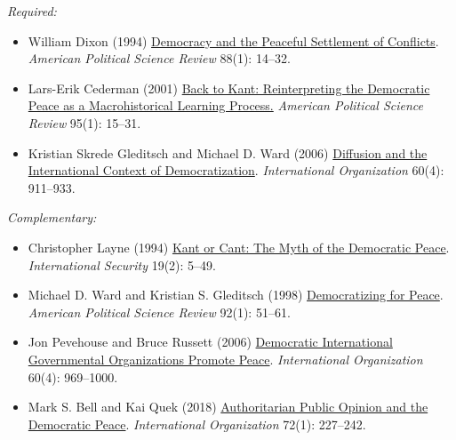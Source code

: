 \documentclass[12pt, a4paper]{article}
\begin{document}
\noindent\textit{Required:}

\begin{itemize}
	\item William Dixon (1994) \href{https://doi.org/10.2307/2944879}{Democracy and the Peaceful Settlement of Conflicts}. \textit{American Political Science Review} 88(1): 14--32.
  \item Lars-Erik Cederman (2001) \href{https://doi.org/10.1017/S0003055401000028}{Back to Kant: Reinterpreting the Democratic Peace as a Macrohistorical Learning Process.} \textit{American Political Science Review} 95(1): 15--31.
	\item Kristian Skrede Gleditsch and Michael D. Ward (2006) \href{https://doi.org/10.1017/S0020818306060309}{Diffusion and the International Context of Democratization}. \textit{International Organization} 60(4): 911--933.
	\end{itemize}

\noindent\textit{Complementary:}

\begin{itemize}
	\item Christopher Layne (1994) \href{https://doi.org/10.2307/2539195}{Kant or Cant: The Myth of the Democratic Peace}. \textit{International Security} 19(2): 5--49.
  \item Michael D. Ward and Kristian S. Gleditsch (1998) \href{https://doi.org/10.2307/2585928}{Democratizing for Peace}. \textit{American Political Science Review} 92(1): 51--61.
	\item Jon Pevehouse and Bruce Russett (2006) \href{https://doi.org/10.1017/S0020818306060322}{Democratic International Governmental Organizations Promote Peace}. \textit{International Organization} 60(4): 969--1000.
  \item Mark S. Bell and Kai Quek (2018) \href{https://doi.org/10.1017/S002081831700042X}{Authoritarian Public Opinion and the Democratic Peace}. \textit{International Organization} 72(1): 227--242.
\end{itemize}
\end{document}
